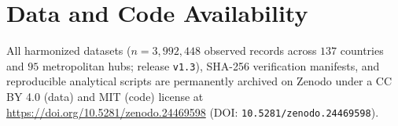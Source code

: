 \documentclass[11pt,a4paper]{article}
\begin{document}
\section*{Data and Code Availability}
All harmonized datasets ($n = 3{,}992{,}448$ observed records across $137$ countries and $95$ metropolitan hubs; release \texttt{v1.3}), SHA-256 verification manifests, and reproducible analytical scripts are permanently archived on Zenodo under a CC BY 4.0 (data) and MIT (code) license at \url{https://doi.org/10.5281/zenodo.24469598} (DOI: \texttt{10.5281/zenodo.24469598}).
\end{document}
